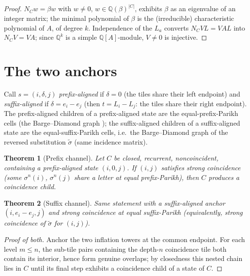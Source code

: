 \documentclass[11pt]{article}
\newtheorem{theorem}{Theorem}[section]
\newcommand{\Q}{\mathbb{Q}}
\newcommand{\NC}{N_{C}}
\begin{document}
\begin{proof}
$\NC w=\beta w$ with $w\ne0$, $w\in\Q(\beta)^{|C|}$, exhibits $\beta$ as
an eigenvalue of an integer matrix; the minimal polynomial of $\beta$ is
the (irreducible) characteristic polynomial of $A$, of degree $k$.
Independence of the $L_a$ converts $\NC VL=VAL$ into $\NC V=VA$; since
$\Q^k$ is a simple $\Q[A]$-module, $V\ne0$ is injective.
\end{proof}

\section{The two anchors}

Call $s=(i,\delta,j)$ \emph{prefix-aligned} if $\delta=0$ (the tiles
share their left endpoint) and \emph{suffix-aligned} if
$\delta=e_i-e_j$ (then $t=L_i-L_j$: the tiles share their right
endpoint). The prefix-aligned children of a prefix-aligned state are the
equal-prefix-Parikh cells (the Barge--Diamond graph
\cite{BD02,AI01}); the suffix-aligned children of a suffix-aligned
state are the equal-suffix-Parikh cells, i.e.\ the Barge--Diamond graph
of the reversed substitution $\tilde\sigma$ (same incidence matrix).

\begin{theorem}[Prefix channel]\label{thm:B}
Let $C$ be closed, recurrent, noncoincident, containing a prefix-aligned
state $(i,0,j)$. If $(i,j)$ satisfies strong coincidence (some
$\sigma^n(i)$, $\sigma^n(j)$ share a letter at equal prefix-Parikh),
then $C$ produces a coincidence child.
\end{theorem}

\begin{theorem}[Suffix channel]\label{thm:Bp}
Same statement with a suffix-aligned anchor $(i,e_i-e_j,j)$ and strong
coincidence at equal \emph{suffix}-Parikh (equivalently, strong
coincidence of $\tilde\sigma$ for $(i,j)$).
\end{theorem}

\begin{proof}[Proof of both]
Anchor the two inflation towers at the common endpoint. For each level
$m\le n$, the sub-tile pairs containing the depth-$n$ coincidence tile
both contain its interior, hence form genuine overlaps; by closedness
this nested chain lies in $C$ until its final step exhibits a
coincidence child of a state of $C$.
\end{proof}
\end{document}
